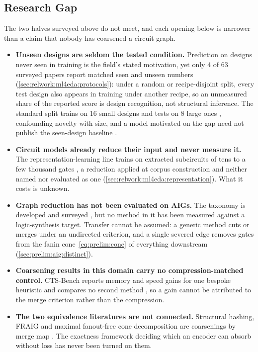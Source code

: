 \subsection{Research Gap}
\label{sec:relwork:gap}
The two halves surveyed above do not meet, and each opening below is narrower than a
claim that nobody has coarsened a circuit graph.

\begin{itemize}
    \item \textbf{Unseen designs are seldom the tested condition.} Prediction on designs
    never seen in training is the field's stated motivation, yet only 4 of 63 surveyed
    papers report matched seen and unseen numbers (\ref{sec:relwork:ml4eda:protocols}): under a
    random or recipe-disjoint split, every test design also appears in training under
    another recipe, so an unmeasured share of the reported score is design recognition,
    not structural inference. The standard split trains on 16 small designs and tests on
    8 large ones \citep{chowdhury2021openabc}, confounding novelty with size, and a model
    motivated on the gap need not publish the seen-design baseline \citep{deng2024hoga}.

    \item \textbf{Circuit models already reduce their input and never measure it.} The
    representation-learning line trains on extracted subcircuits of tens to a few
    thousand gates \citep{li2022deepgate,deepgate4_2025}, a reduction applied at corpus
    construction and neither named nor evaluated as one
    (\ref{sec:relwork:ml4eda:representation}). What it costs is unknown.

    \item \textbf{Graph reduction has not been evaluated on AIGs.} The taxonomy is
    developed and surveyed \citep{hashemi2024survey,shabani2023summarization}, but no
    method in it has been measured against a logic-synthesis target. Transfer cannot be
    assumed: a generic method cuts or merges under an undirected criterion, and a single
    severed edge removes gates from the fanin cone~\eqref{eq:prelim:cone} of everything
    downstream (\ref{sec:prelim:aig:distinct}).

    \item \textbf{Coarsening results in this domain carry no compression-matched
    control.} CTS-Bench reports memory and speed gains for one bespoke heuristic and
    compares no second method \citep{cts_bench2026}, so a gain cannot be attributed to
    the merge criterion rather than the compression.

    \item \textbf{The two equivalence literatures are not connected.} Structural
    hashing, FRAIG and maximal fanout-free cone decomposition are coarsenings by merge
    map \citep{kuehlmann2002robust,mishchenko2005fraig,mishchenko2006rewriting}. The
    exactness framework deciding which an encoder can absorb without loss
    \citep{bollen2023exact} has never been turned on them.
\end{itemize}
